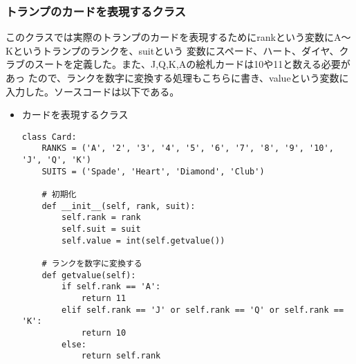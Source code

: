 \subsubsection{トランプのカードを表現するクラス}
このクラスでは実際のトランプのカードを表現するためにrankという変数にA～Kというトランプのランクを、suitという
変数にスペード、ハート、ダイヤ、クラブのスートを定義した。また、J,Q,K,Aの絵札カードは10や11と数える必要があっ
たので、ランクを数字に変換する処理もこちらに書き、valueという変数に入力した。ソースコードは以下である。
\begin{itemize}
\item カードを表現するクラス
\begin{lstlisting}
class Card:
    RANKS = ('A', '2', '3', '4', '5', '6', '7', '8', '9', '10', 'J', 'Q', 'K')
    SUITS = ('Spade', 'Heart', 'Diamond', 'Club')

    # 初期化
    def __init__(self, rank, suit):
        self.rank = rank
        self.suit = suit
        self.value = int(self.getvalue())

    # ランクを数字に変換する
    def getvalue(self):
        if self.rank == 'A':
            return 11
        elif self.rank == 'J' or self.rank == 'Q' or self.rank == 'K':
            return 10
        else:
            return self.rank
\end{lstlisting}
\end{itemize}


